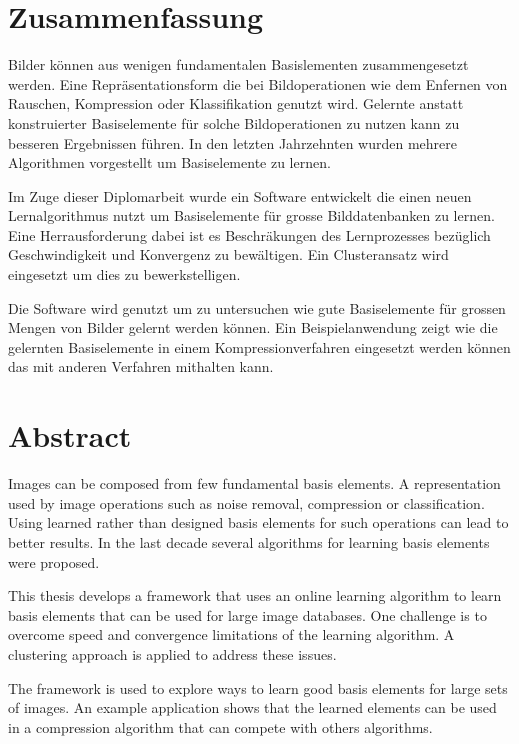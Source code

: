 \newpage
{}
{}
\chapter*{Zusammenfassung}
\thispagestyle{empty}

Bilder k\"{o}nnen aus wenigen fundamentalen Basislementen zusammengesetzt
werden.
Eine Repr\"asentationsform die bei Bildoperationen wie dem
Enfernen von Rauschen, Kompression oder Klassifikation genutzt wird.
Gelernte anstatt konstruierter Basiselemente f\"{u}r solche Bildoperationen zu
nutzen kann zu besseren Ergebnissen f\"{u}hren. In den letzten Jahrzehnten
wurden mehrere Algorithmen vorgestellt um Basiselemente zu lernen.

Im Zuge dieser Diplomarbeit wurde ein Software entwickelt die einen neuen
Lernalgorithmus nutzt um Basiselemente f\"ur grosse Bilddatenbanken
zu lernen. Eine Herrausforderung dabei ist es Beschr\"{a}kungen des
Lernprozesses bez\"{u}glich Geschwindigkeit und Konvergenz zu bew\"altigen. Ein
Clusteransatz wird eingesetzt um dies zu bewerkstelligen.

Die Software wird genutzt um zu untersuchen wie gute
Basiselemente f\"{u}r grossen Mengen von Bilder gelernt werden k\"{o}nnen.
Ein Beispielanwendung zeigt wie die gelernten Basiselemente in einem
Kompressionverfahren eingesetzt werden k\"{o}nnen das mit anderen Verfahren
mithalten kann.

\newpage
{}
{}
\chapter*{Abstract}
\thispagestyle{empty}

Images can be composed from few fundamental basis elements. 
A representation used by image operations such as noise removal,
compression or classification. Using learned rather than designed basis elements
for such operations can lead to better results. In the last decade several
algorithms for learning basis elements were proposed.

This thesis develops a framework that uses an online learning
algorithm to learn basis elements that can be used for large image
databases. One challenge is to overcome speed and convergence limitations of the
learning algorithm. A clustering approach is applied to address these issues. 

The framework is used to explore ways to learn good basis elements for
large sets of images. An example application shows that the learned elements
can be used in a compression algorithm that can compete with others algorithms.

